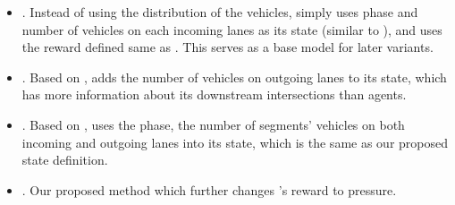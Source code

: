 \begin{itemize}[wide,noitemsep,topsep=0pt]
    \item \textbf{\base}. Instead of using the distribution of the vehicles, \base simply uses phase and number of vehicles on each incoming lanes as its state (similar to \LIT), and uses the reward defined same as \LIT. This serves as a base model for later variants.
    \item \textbf{\NDeeplight}. Based on \base, \NDeeplight adds the number of vehicles on outgoing lanes to its state, which has more information about its downstream intersections than \base agents.
    \item \textbf{\SNDeeplight}. Based on \NDeeplight, \SNDeeplight uses the phase, the number of segments' vehicles on both incoming and outgoing lanes into its state, which is the same as our proposed state definition.
    \item \textbf{\PressLight}. Our proposed method which further changes \SNDeeplight's reward to pressure.
\end{itemize}


